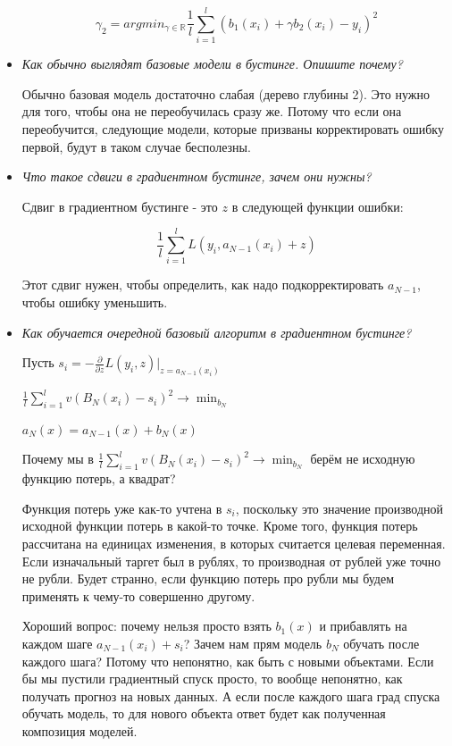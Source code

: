 \documentclass[12pt]{article}
\begin{document}
\begin{itemize}
\[ \gamma_2 = argmin_{\gamma \in \mathbb{R}} \frac{1}{l} \sum_{i=1}^l \left( b_1(x_i) + \gamma b_2(x_i) - y_i \right)^2 \]


\item \textit{ Как обычно выглядят базовые модели в бустинге. Опишите почему?}

Обычно базовая модель достаточно слабая (дерево глубины 2). Это нужно для того, чтобы она не переобучилась сразу же. Потому что если она переобучится, следующие модели, которые призваны корректировать ошибку первой, будут в таком случае бесполезны.

\item \textit{Что такое сдвиги в градиентном бустинге, зачем они нужны?}

Сдвиг в градиентном бустинге - это $z$ в следующей функции ошибки:

\[ \frac{1}{l} \sum_{i=1}^l L(y_i, a_{N-1}(x_i)+ z) \]

Этот сдвиг нужен, чтобы определить, как надо подкорректировать $a_{N-1}$, чтобы ошибку уменьшить.

\item \textit{Как обучается очередной базовый алгоритм в градиентном бустинге?}

Пусть $s_i = - \frac{\partial}{\partial z} L(y_i, z) |_{z=a_{N-1}(x_i)}$

$\frac{1}{l} \sum_{i=1}^lv(B_N(x_i) - s_i)^2 \rightarrow \min_{b_N}$

$a_N(x) = a_{N-1} (x) + b_N(x)$


Почему мы в $\frac{1}{l} \sum_{i=1}^lv(B_N(x_i) - s_i)^2 \rightarrow \min_{b_N}$ берём не исходную функцию потерь, а квадрат?

Функция потерь уже как-то учтена в $s_i$, поскольку это значение производной исходной функции потерь в какой-то точке. Кроме того, функция потерь рассчитана на единицах изменения, в которых считается целевая переменная. Если изначальный таргет был в рублях, то производная от рублей уже точно не рубли. Будет странно, если функцию потерь про рубли мы будем применять к чему-то совершенно другому.

Хороший вопрос: почему нельзя просто взять $b_1(x)$ и прибавлять на каждом шаге $a_{N-1} (x_i) + s_i$? Зачем нам прям модель $b_N$ обучать после каждого шага? Потому что непонятно, как быть с новыми объектами. Если бы мы пустили градиентный спуск просто, то вообще непонятно, как получать прогноз на новых данных. А если после каждого шага град спуска обучать модель, то для нового объекта ответ будет как полученная композиция моделей.


\end{itemize}
\end{document}
